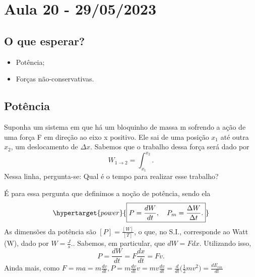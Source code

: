 \documentclass[physics_notes.tex]{subfiles}
\begin{document}
\section{Aula 20 - 29/05/2023}
\subsection{O que esperar?}
\begin{itemize}
	\item Potência;
	\item Forças não-conservativas.
\end{itemize}
\subsection{Potência}
Suponha um sistema em que há um bloquinho de massa m sofrendo a ação de uma força F
em direção ao eixo x positivo. Ele sai de uma posição \(x_{1}\) até outra
\(x_{2}\), um deslocamento de \(\Delta x\). Sabemos que o trabalho dessa força será
dado por
\[
	W_{1\rightarrow2} = \int_{x_{1}}^{x_{2}}.
\]
Nessa linha, pergunta-se: Qual é o tempo para realizar esse trabalho?

É para essa pergunta que definimos a noção de potência, sendo ela
\[
	\hypertarget{power}{\boxed{P = \frac{dW}{dt},\quad P_{m} = \frac{\Delta W}{\Delta t}.}}
\]
As dimensões da potência são \([P]=\frac{[W]}{[T]}\), o que, no S.I., corresponde ao Watt (W), dado por
\(W = \frac{J}{s}.\). Sabemos, em particular, que \(dW = Fdx.\) Utilizando isso,
\[
	P = \frac{dW}{dt} = F \frac{dx}{dt} = Fv.
\]
Ainda mais, como \(F = m a = m \frac{dv}{dt}, P=m \frac{dv}{dt}v = mv \frac{dv}{dt} = \frac{d}{dt}\biggl(\frac{1}{2}mv^{2}\biggr) = \frac{dE_{cin}}{dt}\)
\end{document}
